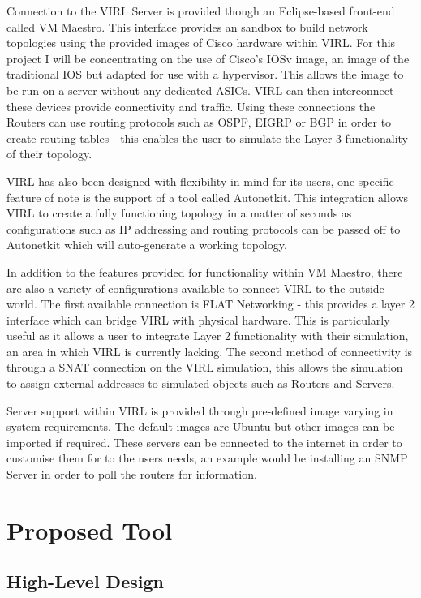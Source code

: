 \documentclass[11pt]{report}
\begin{document}
Connection to the VIRL Server is provided though an Eclipse-based front-end called VM Maestro. This interface provides an sandbox to build network topologies using the provided images of Cisco hardware within VIRL. For this project I will be concentrating on the use of Cisco's IOSv image, an image of the traditional IOS but adapted for use with a hypervisor. This allows the image to be run on a server without any dedicated ASICs. VIRL can then interconnect these devices provide connectivity and traffic. Using these connections the Routers can use routing protocols such as OSPF, EIGRP or BGP in order to create routing tables - this enables the user to simulate the Layer 3 functionality of their topology.

VIRL has also been designed with flexibility in mind for its users, one specific feature of note is the support of a tool called Autonetkit. This integration allows VIRL to create a fully functioning topology in a matter of seconds as configurations such as IP addressing and routing protocols can be passed off to Autonetkit which will auto-generate a working topology.

In addition to the features provided for functionality within VM Maestro, there are also a variety of configurations available to connect VIRL to the outside world. The first available connection is FLAT Networking - this provides a layer 2 interface which can bridge VIRL with physical hardware. This is particularly useful as it allows a user to integrate Layer 2 functionality with their simulation, an area in which VIRL is currently lacking. The second method of connectivity is through a SNAT connection on the VIRL simulation, this allows the simulation to assign external addresses to simulated objects such as Routers and Servers.

Server support within VIRL is provided through pre-defined image varying in system requirements. The default images are Ubuntu but other images can be imported if required. These servers can be connected to the internet in order to customise them for to the users needs, an example would be installing an SNMP Server in order to poll the routers for information.

\chapter{Proposed Tool}

\section{High-Level Design}
\end{document}
